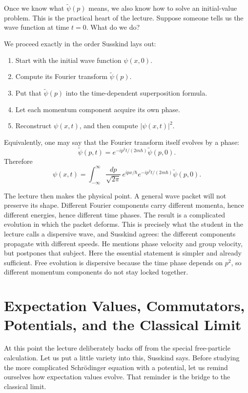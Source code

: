 Once we know what \(\tilde\psi(p)\) means, we also know how to solve an initial-value problem. This is the practical heart of the lecture. Suppose someone tells us the wave function at time \(t=0\). What do we do?

We proceed exactly in the order Susskind lays out:
\begin{enumerate}
\item Start with the initial wave function \(\psi(x,0)\).
\item Compute its Fourier transform \(\tilde\psi(p)\).
\item Put that \(\tilde\psi(p)\) into the time-dependent superposition formula.
\item Let each momentum component acquire its own phase.
\item Reconstruct \(\psi(x,t)\), and then compute \(|\psi(x,t)|^2\).
\end{enumerate}

Equivalently, one may say that the Fourier transform itself evolves by a phase:
\begin{equation}
\tilde\psi(p,t)
=
e^{-i p^2 t/(2m\hbar)}\tilde\psi(p,0).
\end{equation}
Therefore
\begin{equation}
\psi(x,t)
=
\int_{-\infty}^{\infty}
\frac{dp}{\sqrt{2\pi}}\,
e^{ipx/\hbar}
e^{-i p^2 t/(2m\hbar)}
\tilde\psi(p,0).
\end{equation}

The lecture then makes the physical point. A general wave packet will not preserve its shape. Different Fourier components carry different momenta, hence different energies, hence different time phases. The result is a complicated evolution in which the packet deforms. This is precisely what the student in the lecture calls a dispersive wave, and Susskind agrees: the different components propagate with different speeds. He mentions phase velocity and group velocity, but postpones that subject. Here the essential statement is simpler and already sufficient. Free evolution is dispersive because the time phase depends on \(p^2\), so different momentum components do not stay locked together.

\section{Expectation Values, Commutators, Potentials, and the Classical Limit}

At this point the lecture deliberately backs off from the special free-particle calculation. Let us put a little variety into this, Susskind says. Before studying the more complicated Schr\"odinger equation with a potential, let us remind ourselves how expectation values evolve. That reminder is the bridge to the classical limit.

